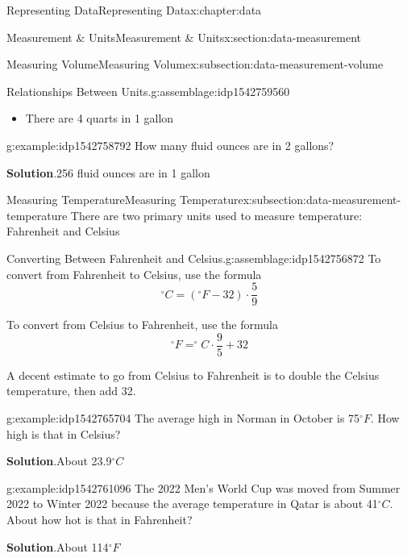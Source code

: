 \documentclass[oneside,10pt,]{book}
\newcommand{\blocktitlefont}{\relax}
\begin{document}
\begin{chapterptx}{Representing Data}{}{Representing Data}{}{}{x:chapter:data}
\begin{sectionptx}{Measurement \& Units}{}{Measurement \& Units}{}{}{x:section:data-measurement}
\begin{subsectionptx}{Measuring Volume}{}{Measuring Volume}{}{}{x:subsection:data-measurement-volume}
\begin{assemblage}{Relationships Between Units.}{g:assemblage:idp1542759560}
\begin{itemize}[label=\textbullet]
\item{}There are 4 quarts in 1 gallon%
\end{itemize}
%
\end{assemblage}
\begin{example}{}{g:example:idp1542758792}%
How many fluid ounces are in 2 gallons?%
\par\smallskip%
\noindent\textbf{\blocktitlefont Solution}.\hypertarget{g:solution:idp1542757768}{}\quad{}256 fluid ounces are in 1 gallon%
\end{example}
\end{subsectionptx}
%
%
\typeout{************************************************}
\typeout{************************************************}
%
\begin{subsectionptx}{Measuring Temperature}{}{Measuring Temperature}{}{}{x:subsection:data-measurement-temperature}
There are two primary units used to measure temperature: Fahrenheit and Celsius%
\begin{assemblage}{Converting Between Fahrenheit and Celsius.}{g:assemblage:idp1542756872}%
To convert from Fahrenheit to Celsius, use the formula%
\begin{equation*}
^\circ C = (^\circ F-32)\cdot \dfrac{5}{9}
\end{equation*}
%
\par
To convert from Celsius to Fahrenheit, use the formula%
\begin{equation*}
^\circ F = ^\circ C\cdot \dfrac{9}{5} + 32
\end{equation*}
%
\par
A decent estimate to go from Celsius to Fahrenheit is to double the Celsius temperature, then add 32.%
\end{assemblage}
\begin{example}{}{g:example:idp1542765704}%
The average high in Norman in October is 75\(^\circ F\).  How high is that in Celsius?%
\par\smallskip%
\noindent\textbf{\blocktitlefont Solution}.\hypertarget{g:solution:idp1542765064}{}\quad{}About 23.9\(^\circ C\)%
\end{example}
\begin{example}{}{g:example:idp1542761096}%
The 2022 Men's World Cup was moved from Summer 2022 to Winter 2022 because the average temperature in Qatar is about 41\(^\circ C\).  About how hot is that in Fahrenheit?%
\par\smallskip%
\noindent\textbf{\blocktitlefont Solution}.\hypertarget{g:solution:idp1542761224}{}\quad{}About 114\(^\circ F\)%

\end{example}
\end{subsectionptx}
\end{sectionptx}
\end{chapterptx}
\end{document}
